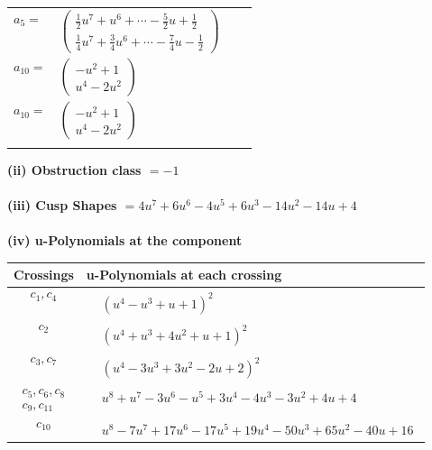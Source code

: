 \documentclass[1p]{elsarticle_modified}
\theoremstyle{definition}
\begin{document}
\begin{tabular}{m{7pt} m{180pt} m{7pt} m{180pt} }
\flushright $a_{5}=$&$\begin{pmatrix}\frac{1}{2} u^7+u^6+\cdots-\frac{5}{2} u+\frac{1}{2}\\\frac{1}{4} u^7+\frac{3}{4} u^6+\cdots-\frac{7}{4} u-\frac{1}{2}\end{pmatrix}$ \\
\flushright $a_{10}=$&$\begin{pmatrix}- u^2+1\\u^4-2 u^2\end{pmatrix}$\\ \flushright $a_{10}=$&$\begin{pmatrix}- u^2+1\\u^4-2 u^2\end{pmatrix}$\\&\end{tabular}
\flushleft \textbf{(ii) Obstruction class $= -1$}\\~\\
\flushleft \textbf{(iii) Cusp Shapes $= 4 u^7+6 u^6-4 u^5+6 u^3-14 u^2-14 u+4$}\\~\\
\newpage\renewcommand{\arraystretch}{1}
\flushleft \textbf{(iv) u-Polynomials at the component}\newline \\
\begin{tabular}{m{50pt}|m{274pt}}
Crossings & \hspace{64pt}u-Polynomials at each crossing \\
\hline $$\begin{aligned}c_{1},c_{4}\end{aligned}$$&$\begin{aligned}
&(u^4- u^3+u+1)^2
\end{aligned}$\\
\hline $$\begin{aligned}c_{2}\end{aligned}$$&$\begin{aligned}
&(u^4+u^3+4 u^2+u+1)^2
\end{aligned}$\\
\hline $$\begin{aligned}c_{3},c_{7}\end{aligned}$$&$\begin{aligned}
&(u^4-3 u^3+3 u^2-2 u+2)^2
\end{aligned}$\\
\hline $$\begin{aligned}c_{5},c_{6},c_{8}\\c_{9},c_{11}\end{aligned}$$&$\begin{aligned}
&u^8+u^7-3 u^6- u^5+3 u^4-4 u^3-3 u^2+4 u+4
\end{aligned}$\\
\hline $$\begin{aligned}c_{10}\end{aligned}$$&$\begin{aligned}
&u^8-7 u^7+17 u^6-17 u^5+19 u^4-50 u^3+65 u^2-40 u+16
\end{aligned}$\\
\hline
\end{tabular}\\~\\
\end{document}
